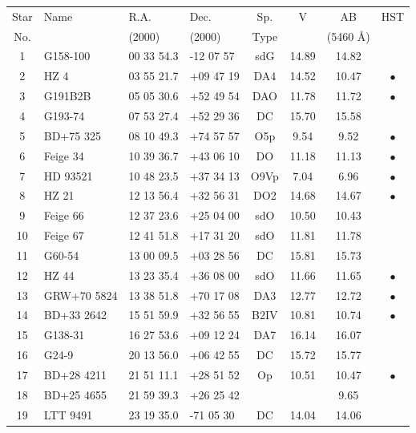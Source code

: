 \begin{table}[htbp]

\begin{center}
\begin{tabular}{clllcccc}
Star &  Name     &   R.A.      &   Dec.     & Sp.  &   V    &  AB   & HST \\
No.  &           &  (2000)     &  (2000)    & Type & & (5460 \AA) & \\ \hline
1  & G158-100    & 00 33 54.3  & -12 07 57  & sdG  & 14.89  & 14.82 & \\
2  & HZ 4        & 03 55 21.7  & +09 47 19  & DA4  & 14.52  & 10.47 & $\bullet$ \\
3  & G191B2B     & 05 05 30.6  & +52 49 54  & DAO  & 11.78  & 11.72 & $\bullet$ \\
4  & G193-74     & 07 53 27.4  & +52 29 36  & DC   & 15.70  & 15.58 & \\
5  & BD+75 325   & 08 10 49.3  & +74 57 57  & O5p  &  9.54  &  9.52 & $\bullet$ \\
6  & Feige 34    & 10 39 36.7  & +43 06 10  & DO   & 11.18  & 11.13 & $\bullet$ \\
7  & HD 93521    & 10 48 23.5  & +37 34 13  & O9Vp &  7.04  &  6.96 & $\bullet$ \\
8  & HZ 21       & 12 13 56.4  & +32 56 31  & DO2  & 14.68  & 14.67 & $\bullet$ \\
9  & Feige 66    & 12 37 23.6  & +25 04 00  & sdO  & 10.50  & 10.43 & \\
10 & Feige 67    & 12 41 51.8  & +17 31 20  & sdO  & 11.81  & 11.78 & \\
11 & G60-54      & 13 00 09.5  & +03 28 56  & DC   & 15.81  & 15.73 & \\
12 & HZ 44       & 13 23 35.4  & +36 08 00  & sdO  & 11.66  & 11.65 & $\bullet$ \\
13 & GRW+70 5824 & 13 38 51.8  & +70 17 08  & DA3  & 12.77  & 12.72 & $\bullet$ \\
14 & BD+33 2642  & 15 51 59.9  & +32 56 55  & B2IV & 10.81  & 10.74 & $\bullet$ \\
15 & G138-31     & 16 27 53.6  & +09 12 24  & DA7  & 16.14  & 16.07 & \\
16 & G24-9       & 20 13 56.0  & +06 42 55  & DC   & 15.72  & 15.77 & \\
17 & BD+28 4211  & 21 51 11.1  & +28 51 52  & Op   & 10.51  & 10.47 & $\bullet$ \\
18 & BD+25 4655  & 21 59 39.3  & +26 25 42  &      &        &  9.65 & \\
19 & LTT 9491    & 23 19 35.0  & -71 05 30  & DC   & 14.04  & 14.06 & \\

\end{tabular}
\end{center}
\end{table}
